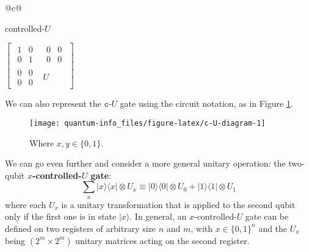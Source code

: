 \documentclass[fleqn]{article}
\newenvironment{idea}{\noindent}{\medskip}
\begin{document}
\begin{idea}

\begin{longtable}[]{@{}c@{}}
\toprule
\begin{minipage}[b]{(\columnwidth - 0\tabcolsep) * \real{1.00}}\centering
controlled-\(U\)\strut
\end{minipage}\tabularnewline
\midrule
\endhead
\begin{minipage}[t]{(\columnwidth - 0\tabcolsep) * \real{1.00}}\centering
\(\left[\begin{array}{c|c}\begin{matrix}1&0\\0&1\end{matrix}&\begin{matrix}0&0\\0&0\end{matrix}\\\hline\begin{matrix}0&0\\0&0\end{matrix}&U\end{array}\right]\)\strut
\end{minipage}\tabularnewline
\bottomrule
\end{longtable}

\end{idea}

We can also represent the \(\texttt{c-}U\) gate using the circuit notation, as in Figure \ref{fig:c-U-diagram}.



\begin{figure}[H]

{\centering \texttt{[image: quantum-info\_files/figure-latex/c-U-diagram-1]} 

}

\caption{Where \(x,y\in\{0,1\}\).}\label{fig:c-U-diagram}
\end{figure}

We can go even further and consider a more general unitary operation: the two-qubit \textbf{\(x\)-controlled-\(U\) gate}:
\[
  \sum_x |x\rangle\langle x|\otimes U_x
  \equiv
  |0\rangle\langle 0|\otimes U_0 + |1\rangle\langle 1|\otimes U_1
\]
where each \(U_x\) is a unitary transformation that is applied to the second qubit only if the first one is in state \(|x\rangle\).
In general, an \(x\)-controlled-\(U\) gate can be defined on two registers of arbitrary size \(n\) and \(m\), with \(x\in\{0,1\}^n\) and the \(U_x\) being \((2^m\times 2^m)\) unitary matrices acting on the second register.
\end{document}
